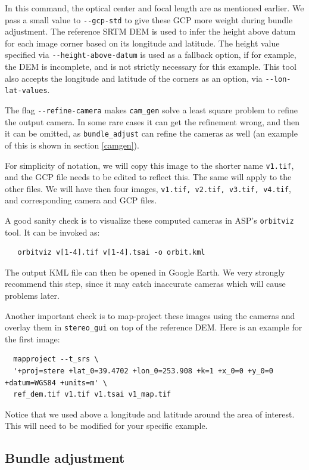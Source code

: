 In this command, the optical center and focal length are as mentioned earlier. We 
pass a small value to \texttt{-\/-gcp-std} to give these GCP more weight during
bundle adjustment. The reference SRTM DEM is used to infer the height above datum for
each image corner based on its longitude and latitude. The height value specified
via \texttt{-\/-height-above-datum} is used as a fallback option, if for example,
the DEM is incomplete, and is not strictly necessary for this example. 
This tool also accepts the longitude and latitude of the corners as an option,
via \texttt{-\/-lon-lat-values}.

The flag \texttt{-\/-refine-camera} makes \texttt{cam\_gen} solve a least
square problem to refine the output camera. In some rare cases it can get the
refinement wrong, and then it can be omitted, as \texttt{bundle\_adjust}
can refine the cameras as well (an example of this is shown in section \ref{camgen}).

For simplicity of notation, we will copy this image to the shorter name
\texttt{v1.tif}, and the GCP file needs to be edited to reflect
this. The same will apply to the other files. We will have then four
images, \texttt{v1.tif, v2.tif, v3.tif, v4.tif}, and corresponding
camera and GCP files.

A good sanity check is to visualize these computed cameras in ASP's
\texttt{orbitviz} tool. It can be invoked as:
\begin{verbatim}
   orbitviz v[1-4].tif v[1-4].tsai -o orbit.kml
\end{verbatim}

The output KML file can then be opened in Google Earth. We very strongly recommend this step, 
since it may catch inaccurate cameras which will cause problems later. 

Another important check is to map-project these images using the cameras
and overlay them in \texttt{stereo\_gui} on top of the reference
DEM. Here is an example for the first image:
\begin{verbatim}
  mapproject --t_srs \
  '+proj=stere +lat_0=39.4702 +lon_0=253.908 +k=1 +x_0=0 +y_0=0 +datum=WGS84 +units=m' \
  ref_dem.tif v1.tif v1.tsai v1_map.tif 
\end{verbatim}

Notice that we used above a longitude and latitude around the area of interest. This 
will need to be modified for your specific example. 

\subsection{Bundle adjustment}

